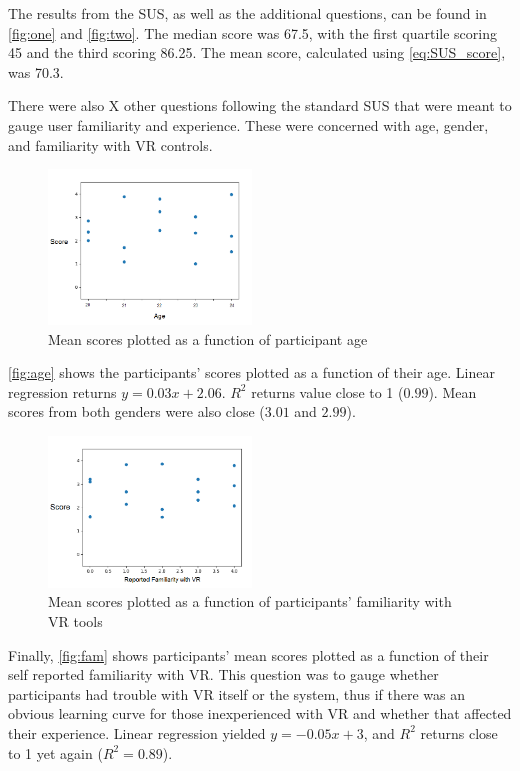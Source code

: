 The results from the SUS, as well as the additional questions, can be found in \autoref{fig:one} and \autoref{fig:two}.
The median score was 67.5, with the first quartile scoring 45 and the third scoring 86.25. The mean score, calculated using \autoref{eq:SUS_score}, was 70.3. %

There were also X other questions following the standard SUS that were meant to gauge user familiarity and experience. These were concerned with age, gender, and familiarity with VR controls. 

\begin{figure}[H]
	\centering
	\includegraphics[width = 0.48\textwidth]{age.png}
	\caption{Mean scores plotted as a function of participant age}
	\label{fig:age}
\end{figure}

\autoref{fig:age} shows the participants' scores plotted as a function of their age. Linear regression returns $y = 0.03x + 2.06$. $R^2$ returns value close to 1 ($0.99$). Mean scores from both genders were also close ($ 3.01 $ and $ 2.99 $). 

\begin{figure}[H]
	\centering
	\includegraphics[width = 0.48\textwidth]{Familiarity.png}
	\caption{Mean scores plotted as a function of participants' familiarity with VR tools}
	\label{fig:fam}
\end{figure}

Finally, \autoref{fig:fam} shows participants' mean scores plotted as a function of their self reported familiarity with VR. This question was to gauge whether participants had trouble with VR itself or the system, thus if there was an obvious learning curve for those inexperienced with VR and whether that affected their experience. Linear regression yielded $y = -0.05x + 3$, and $R^2$ returns close to 1 yet again ($R^2=0.89$).